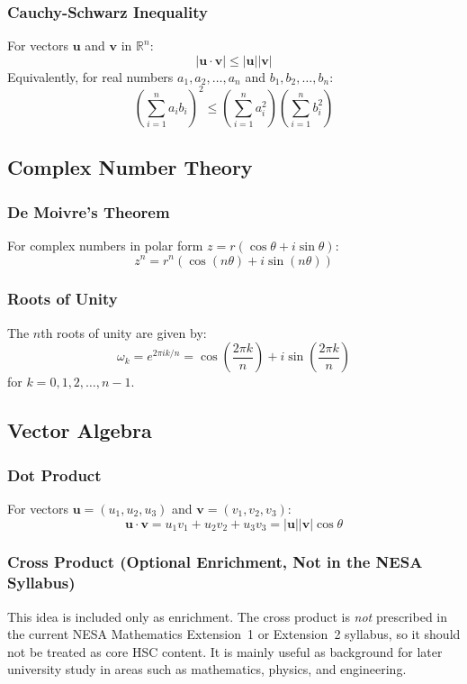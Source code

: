 \documentclass[12pt]{article}
\begin{document}
\subsubsection{Cauchy-Schwarz Inequality}
\begin{theorem}
For vectors $\mathbf{u}$ and $\mathbf{v}$ in $\mathbb{R}^n$:
\[|\mathbf{u} \cdot \mathbf{v}| \leq |\mathbf{u}| |\mathbf{v}|\]
Equivalently, for real numbers $a_1, a_2, \ldots, a_n$ and $b_1, b_2, \ldots, b_n$:
\[\left(\sum_{i=1}^{n} a_i b_i\right)^2 \leq \left(\sum_{i=1}^{n} a_i^2\right)\left(\sum_{i=1}^{n} b_i^2\right)\]
\end{theorem}

\subsection{Complex Number Theory}
\subsubsection{De Moivre's Theorem}
\begin{theorem}
For complex numbers in polar form $z = r(\cos\theta + i\sin\theta)$:
\[z^n = r^n(\cos(n\theta) + i\sin(n\theta))\]
\end{theorem}

\subsubsection{Roots of Unity}
\begin{theorem}
The $n$th roots of unity are given by:
\[\omega_k = e^{2\pi i k/n} = \cos\left(\frac{2\pi k}{n}\right) + i\sin\left(\frac{2\pi k}{n}\right)\]
for $k = 0, 1, 2, \ldots, n-1$.
\end{theorem}

\subsection{Vector Algebra}
\subsubsection{Dot Product}
For vectors $\mathbf{u} = (u_1, u_2, u_3)$ and $\mathbf{v} = (v_1, v_2, v_3)$:
\[\mathbf{u} \cdot \mathbf{v} = u_1v_1 + u_2v_2 + u_3v_3 = |\mathbf{u}||\mathbf{v}|\cos\theta\]

\subsubsection{Cross Product (Optional Enrichment, Not in the NESA Syllabus)}
This idea is included only as enrichment. The cross product is \emph{not} prescribed in the current NESA Mathematics Extension~1 or Extension~2 syllabus, so it should not be treated as core HSC content. It is mainly useful as background for later university study in areas such as mathematics, physics, and engineering.
\end{document}
